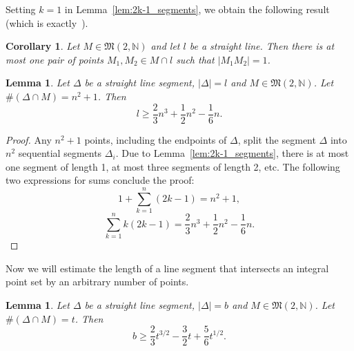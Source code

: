 \documentclass[a4paper,14pt]{article} %
\theoremstyle{plain}
\newtheorem{lemma}[theorem]{Lemma}
\newtheorem{corollary}[theorem]{Corollary}
\theoremstyle{definition}
\begin{document}
Setting $k=1$ in Lemma~\ref{lem:2k-1_segments},
we obtain the following result (which is exactly~\cite[Lemma 3]{our-vmmsh-2018-translit}).
\begin{corollary}
	\label{cor:only_one_distance_1_on_straight_line}
	Let $M \in \mathfrak{M}(2,\mathbb{N})$ and let $l$ be a straight line.
	Then there is at most one pair of points $M_1,M_2\in M \cap l$
	such that $|M_1 M_2| = 1$.
\end{corollary}


\begin{lemma}
	\label{lem:line_segment_with n_squared_plus_one_points}
	Let $\Delta$ be a straight line segment, $|\Delta|=l$ and $M \in \mathfrak{M}(2,\mathbb{N})$.
	Let $\#(\Delta \cap M) = n^2 + 1$.
	Then
	\begin{equation}
		l \geq \frac{2}{3}n^3+\frac{1}{2}n^2-\frac{1}{6}n
		.
	\end{equation}
\end{lemma}

\begin{proof}
	Any $n^2+1$ points, including the endpoints of $\Delta$, split the segment $\Delta$ into $n^2$
	sequential segments $\Delta_i$.
	Due to Lemma~\ref{lem:2k-1_segments}, there is at most one segment of length 1,
	at most three segments of length 2, etc.
	The following two expressions for sums conclude the proof:
	\begin{equation}
		1 + \sum_{k=1}^n (2k-1) = n^2 + 1
		,
	\end{equation}
	\begin{equation}
		\sum_{k=1}^n k(2k-1) = \frac{2}{3}n^3+\frac{1}{2}n^2-\frac{1}{6}n
		.
	\end{equation}
\end{proof}

Now we will estimate the length of a line segment that intersects an integral point set
by an arbitrary number of points.

\begin{lemma}
	\label{lem:line_segment_cardinality}
	Let $\Delta$ be a straight line segment, $|\Delta| = b$ and $M \in \mathfrak{M}(2,\mathbb{N})$.
	Let $\#(\Delta \cap M) = t$.
	Then
	\begin{equation}
		\label{eq:estimate_for_segment_length}
		b\geq \frac{2}{3}t^{3/2}-\frac{3}{2}t+\frac{5}{6}t^{1/2}
		.
	\end{equation}
\end{lemma}
\end{document}
